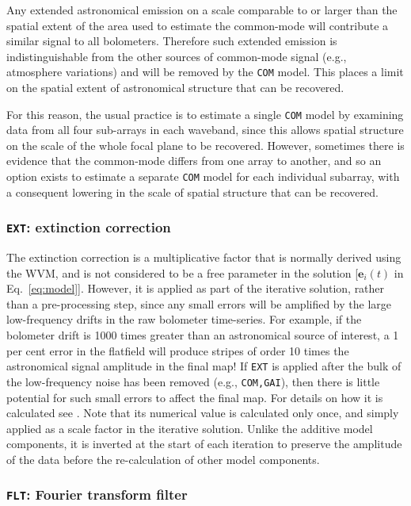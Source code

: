 \documentclass[useAMS,usenatbib,nofootinbib]{mn2e}
\newcommand{\model}[1]{\texttt{#1}}
\begin{document}
Any extended astronomical emission on a scale comparable to or larger
than the spatial extent of the area used to estimate the common-mode
will contribute a similar signal to all bolometers. Therefore such
extended emission is indistinguishable from the other sources of
common-mode signal (e.g., atmosphere variations) and will be removed
by the \model{COM} model. This places a limit on the spatial extent of
astronomical structure that can be recovered.

For this reason, the usual practice is to estimate a single
\model{COM} model by examining data from all four sub-arrays in each
waveband, since this allows spatial structure on the scale of the
whole focal plane to be recovered. However, sometimes there is
evidence that the common-mode differs from one array to another, and
so an option exists to estimate a separate \model{COM} model for each
individual subarray, with a consequent lowering in the scale of
spatial structure that can be recovered.

\subsubsection{\model{EXT}: extinction correction}
\label{sec:ext}

The extinction correction is a multiplicative factor that is normally
derived using the WVM, and is not considered to be a free parameter in
the solution [$\mathbf{e}_i(t)$ in Eq.~\ref{eq:model}]. However, it is
applied as part of the iterative solution, rather than a
pre-processing step, since any small errors will be amplified by the
large low-frequency drifts in the raw bolometer time-series. For
example, if the bolometer drift is 1000 times greater than an
astronomical source of interest, a 1 per cent error in the flatfield
will produce stripes of order 10 times the astronomical signal
amplitude in the final map! If \model{EXT} is applied after the bulk
of the low-frequency noise has been removed (e.g., \model{COM,GAI}),
then there is little potential for such small errors to affect the
final map.  For details on how it is calculated see
\citet{dempsey2012}. Note that its numerical value is calculated only
once, and simply applied as a scale factor in the iterative
solution. Unlike the additive model components, it is inverted at the
start of each iteration to preserve the amplitude of the data before
the re-calculation of other model components.

\subsubsection{\model{FLT}: Fourier transform filter}
\label{sec:flt}
\end{document}
